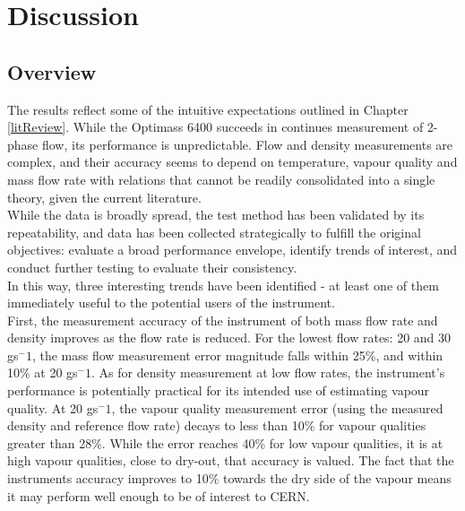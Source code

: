 \documentclass{report}
\begin{document}
\chapter{Discussion} \label{discussion}
\section{Overview}
The results reflect some of the intuitive expectations outlined in Chapter \ref{litReview}. While the Optimass 6400 succeeds in continues measurement of 2-phase flow, its performance is unpredictable. Flow and density measurements are complex, and their accuracy seems to depend on temperature, vapour quality and mass flow rate with relations that cannot be readily consolidated into a single theory, given the current literature.\\
While the data is broadly spread, the test method has been validated by its repeatability, and data has been collected strategically to fulfill the original objectives: evaluate a broad performance envelope, identify trends of interest, and conduct further testing to evaluate their consistency.\\
In this way, three interesting trends have been identified - at least one of them immediately useful to the potential users of the instrument. \\First, the measurement accuracy of the instrument of both mass flow rate and density improves as the flow rate is reduced. For the lowest flow rates: 20 and 30 gs$^-1$, the mass flow measurement error magnitude falls within 25\%, and within 10\% at 20 gs$^-1$. As for density measurement at low flow rates, the instrument's performance is potentially practical for its intended use of estimating vapour quality. At 20 gs$^-1$, the vapour quality measurement error (using the measured density and reference flow rate)  decays to less than 10\% for vapour qualities greater than 28\%. While the error reaches 40\% for low vapour qualities, it is at high vapour qualities, close to dry-out, that accuracy is valued. The fact that the instruments accuracy improves to 10\% towards the dry side of the vapour means it may perform well enough to be of interest to CERN.\\
\end{document}
